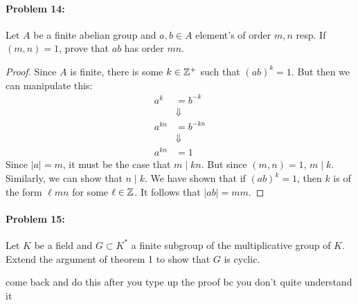 \paragraph{Problem 14:}
Let \(A\) be a finite abelian group and \(a,b \in A\) element's of order \(m,n\)
resp. If \((m,n)=1\), prove that \(ab\) has order \(mn\).

\begin{proof}
  Since \(A\) is finite, there is some \(k \in \mathbb{Z} ^+\) such that \((ab)^k=1\).
  But then we can manipulate this:
  \begin{align*}
    a^k &= b^{-k} \\
        &\Downarrow\\
    a^{kn} &= b^{-kn}\\
        &\Downarrow\\
    a^{kn} &= 1
  \end{align*}
  Since \(|a| = m\), it must be the case that \(m \mid  kn\). But since
  \((m,n)=1\), \(m\mid k\). Similarly, we can show that \(n \mid k\). We have
  shown that if \((ab)^k=1\), then \(k\) is of the form \(\ell mn\) for some
  \(\ell \in \mathbb{Z} \). It follows that \(|ab| = mm\).
\end{proof}

\paragraph{Problem 15:}
Let \(K\) be a field and \(G \subset K^*\) a finite subgroup of the
multiplicative group of \(K\). Extend the argument of theorem 1 to show that
\(G\) is cyclic.

{\color{red} come back and do this after you type up the proof bc you don't
  quite understand it}
